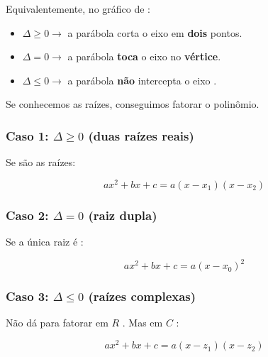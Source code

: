\documentclass[../resumo.tex]{subfiles}
\begin{document}
	Equivalentemente, no gráfico de :
	
	\begin{itemize}
		\item $\Delta \geq 0 \rightarrow$ a parábola corta o eixo em \textbf{dois} pontos.
		\item $\Delta = 0 \rightarrow$ a parábola \textbf{toca} o eixo no \textbf{vértice}.
		\item $\Delta \leq 0 \rightarrow$ a parábola \textbf{não} intercepta o eixo .
	\end{itemize}

	Se conhecemos as raízes, conseguimos fatorar o polinômio.

	\subsubsection{Caso 1: $\Delta \geq 0$ (duas raízes reais)}

	Se  são as raízes:

	\[ ax^2 + bx + c = a(x - x_1)(x - x_2) \]

	\subsubsection{Caso 2: $\Delta = 0$ (raiz dupla)}

	Se a única raiz é :

	\[ ax^2 + bx + c = a(x - x_0)^2 \]

	\subsubsection{Caso 3: $\Delta \leq 0$ (raízes complexas)}

	Não dá para fatorar em $R$ . Mas em $C$ :

	\[ ax^2 + bx + c = a(x - z_1)(x - z_2) \]
\end{document}
